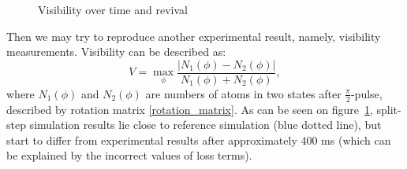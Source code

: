 \documentclass[12pt,notitlepage]{report}
\begin{document}
\begin{figure}
\begin{center}
\qquad
{}
\end{center}
\caption{Visibility over time and revival}
\label{visibility_vs_reference}
\end{figure}

Then we may try to reproduce another experimental result, namely, visibility measurements. Visibility can be described as:
\[ V = \max_{\phi} \frac{\vert N_1(\phi) - N_2(\phi) \vert}{N_1(\phi) + N_2(\phi)}, \]
where $N_1(\phi)$ and $N_2(\phi)$ are numbers of atoms in two states after $\frac{\pi}{2}$-pulse, described by rotation matrix \ref{rotation_matrix}. As can be seen on figure~\ref{visibility_vs_reference}, split-step simulation results lie close to reference simulation (blue dotted line), but start to differ from experimental results after approximately 400 ms (which can be explained by the incorrect values of loss terms).



\end{document}
